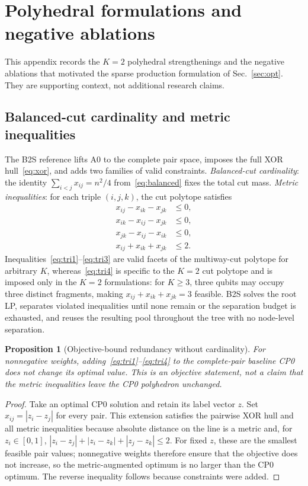 \documentclass[
  aps,
  pra,
  reprint,
  amsmath,
  amssymb,
  longbibliography,
  nofootinbib,
  floatfix
]{revtex4-2}
\theoremstyle{plain}
\newtheorem{proposition}{Proposition}
\begin{document}
\section{Polyhedral formulations and negative ablations}
\label{app:poly}

This appendix records the $K=2$ polyhedral strengthenings and the negative ablations that motivated the sparse production formulation of Sec.~\ref{sec:opt}. They are supporting context, not additional research claims.

\subsection{Balanced-cut cardinality and metric inequalities}

The B2S reference lifts A0 to the complete pair space, imposes the full XOR hull~\eqref{eq:xor}, and adds two families of valid constraints. \emph{Balanced-cut cardinality}: the identity $\sum_{i<j}x_{ij}=n^2/4$ from~\eqref{eq:balanced} fixes the total cut mass. \emph{Metric inequalities}: for each triple $(i,j,k)$, the cut polytope satisfies~\cite{deza1997}
\begin{align}
  x_{ij} - x_{ik} - x_{jk} &\leq 0, \label{eq:tri1}\\
  x_{ik} - x_{ij} - x_{jk} &\leq 0, \label{eq:tri2}\\
  x_{jk} - x_{ij} - x_{ik} &\leq 0, \label{eq:tri3}\\
  x_{ij} + x_{ik} + x_{jk} &\leq 2. \label{eq:tri4}
\end{align}
Inequalities~\eqref{eq:tri1}--\eqref{eq:tri3} are valid facets of the multiway-cut polytope for arbitrary $K$, whereas~\eqref{eq:tri4} is specific to the $K=2$ cut polytope and is imposed only in the $K=2$ formulations: for $K\ge3$, three qubits may occupy three distinct fragments, making $x_{ij}+x_{ik}+x_{jk}=3$ feasible. B2S solves the root LP, separates violated inequalities until none remain or the separation budget is exhausted, and reuses the resulting pool throughout the tree with no node-level separation.

\begin{proposition}[Objective-bound redundancy without cardinality]\label{prop:redundancy}
For nonnegative weights, adding~\eqref{eq:tri1}--\eqref{eq:tri4} to the complete-pair baseline CP0 does not change its optimal value. This is an objective statement, not a claim that the metric inequalities leave the CP0 polyhedron unchanged.
\end{proposition}
\begin{proof}
Take an optimal CP0 solution and retain its label vector $z$. Set $x_{ij}=|z_i-z_j|$ for every pair. This extension satisfies the pairwise XOR hull and all metric inequalities because absolute distance on the line is a metric and, for $z_i\in[0,1]$, $|z_i-z_j|+|z_i-z_k|+|z_j-z_k|\leq2$. For fixed $z$, these are the smallest feasible pair values; nonnegative weights therefore ensure that the objective does not increase, so the metric-augmented optimum is no larger than the CP0 optimum. The reverse inequality follows because constraints were added.
\end{proof}
\end{document}

